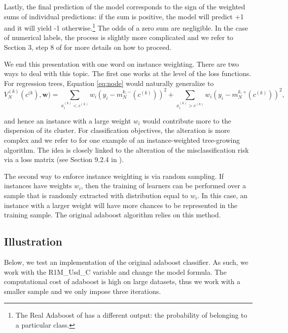 \documentclass[]{krantz}
\let\rmarkdownfootnote\footnote%
\def\footnote{\protect\rmarkdownfootnote}
\theoremstyle{definition}
\theoremstyle{definition}
\theoremstyle{definition}
\theoremstyle{remark}
\begin{document}
Lastly, the final prediction of the model corresponds to the sign of the
weighted sums of individual predictions: if the sum is positive, the
model will predict +1 and it will yield -1 otherwise.\footnote{The Real
  Adaboost of \citet{friedman2000additive} has a different output: the
  probability of belonging to a particular class.} The odds of a zero
sum are negligible. In the case of numerical labels, the process is
slightly more complicated and we refer to Section 3, step 8 of
\citet{drucker1997improving} for more details on how to proceed.

We end this presentation with one word on instance weighting. There are
two ways to deal with this topic. The first one works at the level of
the loss functions. For regression trees, Equation \eqref{eq:node} would
naturally generalize to
\[V^{(k)}_N(c^{(k}), \textbf{w})= \sum_{x_i^{(k)}<c^{(k)}}w_i\left(y_i-m_N^{k,-}(c^{(k)}) \right)^2 + \sum_{x_i^{(k)}>c^{(k)}}w_i\left(y_i-m_N^{k,+}(c^{(k)}) \right)^2,\]

and hence an instance with a large weight \(w_i\) would contribute more
to the dispersion of its cluster. For classification objectives, the
alteration is more complex and we refer to \citet{ting2002instance} for
one example of an instance-weighted tree-growing algorithm. The idea is
closely linked to the alteration of the misclassification risk via a
loss matrix (see Section 9.2.4 in \citet{friedman2009elements}).

The second way to enforce instance weighting is via random sampling. If
instances have weights \(w_i\), then the training of learners can be
performed over a sample that is randomly extracted with distribution
equal to \(w_i\). In this case, an instance with a larger weight will
have more chances to be represented in the training sample. The original
adaboost algorithm relies on this method.

\hypertarget{illustration}{%
\subsection{Illustration}\label{illustration}}

Below, we test an implementation of the original adaboost classifier. As
such, we work with the R1M\_Usd\_C variable and change the model
formula. The computational cost of adaboost is high on large datasets,
thus we work with a smaller sample and we only impose three iterations.

\footnotesize
\end{document}
